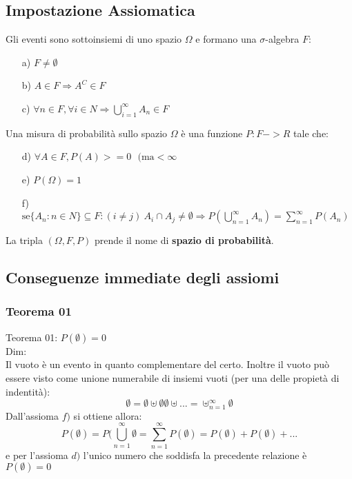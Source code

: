 \subsection{Impostazione Assiomatica}
Gli eventi sono sottoinsiemi di uno spazio $\Omega$ e formano una $\sigma$-algebra $F$:
\begin{itemize}
\item[a)] $ F \neq \emptyset$
\item[b)] $ A \in F \Rightarrow A^C \in F $
\item[c)] $ \forall n \in F, \forall i \in N \Rightarrow \bigcup_{i=1}^{\infty} A_n \in F $
\end{itemize}
Una misura di probabilità sullo spazio $\Omega$ è una funzione $P: F -> R$ tale che:
\begin{itemize}
\item[d)] $\forall A \in F, P(A) >= 0 \:\:\: (\text{ma} < \infty$
\item[e)] $ P(\Omega) = 1 $
\item[f)] $ \text{se} \{A_n: n \in N \} \subseteq F: (i \neq j ) \: A_i \cap A_j \neq \emptyset \Rightarrow P(\bigcup_{n=1}^{\infty}A_n) = \sum_{n=1}^{\infty}P(A_n)$
\end{itemize}
La tripla $(\Omega, F, P)$ prende il nome di \textbf{spazio di probabilità}.

\subsection{Conseguenze immediate degli assiomi}
\subsubsection{Teorema 01}
Teorema 01: $ P(\emptyset) = 0 $\\
Dim:\\
Il vuoto è un evento in quanto complementare del certo. Inoltre il vuoto può essere visto come unione numerabile di insiemi vuoti (per una delle propietà di indentità):
$$ \emptyset = \emptyset \uplus \emptyset \emptyset \uplus ... = \uplus_{n=1}^{\infty} \emptyset $$
Dall'assioma $f)$ si ottiene allora:
$$ P(\emptyset) = P(\bigcup_{n=1}^{\infty} \emptyset = \sum_{n=1}^{\infty} P(\emptyset) = P(\emptyset) + P(\emptyset) + ...$$
e per l'assioma $d)$ l'unico numero che soddisfa la precedente relazione è $P(\emptyset)=0$

